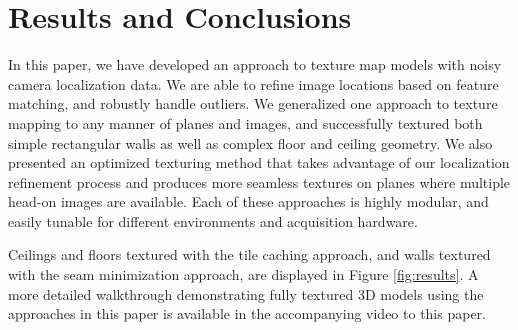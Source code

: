 \documentclass[10pt,twocolumn,letterpaper]{article}
\begin{document}
\section{Results and Conclusions}
\label{sec:resultsAndConclusions}
In this paper, we have developed an approach to texture map models with noisy camera localization data. We are
able to refine image locations based on feature matching, and robustly
handle outliers.  We generalized one approach to texture mapping to
any manner of planes and images, and successfully textured both simple
rectangular walls as well as complex floor and ceiling geometry. We
also presented an optimized texturing method that takes advantage of
our localization refinement process and produces more seamless textures on
planes where multiple head-on images are available. Each of these
approaches is highly modular, and easily tunable for different
environments and acquisition hardware.

Ceilings and floors textured with the tile caching approach, and walls
textured with the seam minimization approach, are displayed in Figure
\ref{fig:results}. A more detailed walkthrough demonstrating fully
textured 3D models using the approaches in this paper is available in
the accompanying video to this paper.
\end{document}
